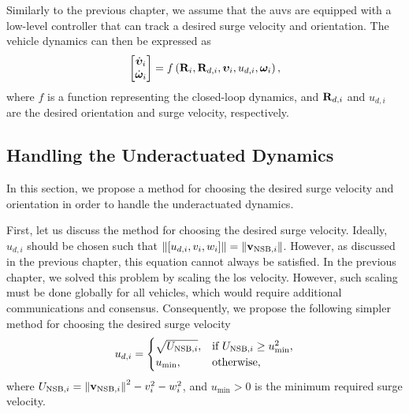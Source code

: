 Similarly to the previous chapter, we assume that the \glspl{auv} are equipped with a low-level controller that can track a desired surge velocity and orientation.
The vehicle dynamics can then be expressed as
\begin{equation}
    \begin{bmatrix}
        \dot{\bm{\upsilon}}_i \\ \dot{\bm{\omega}}_i
    \end{bmatrix}
    = f\left(\mathbf{R}_i, \mathbf{R}_{d,i}, \bm{\upsilon}_i, u_{d, i}, \bm{\omega}_i\right),
\end{equation}
where $f$ is a function representing the closed-loop dynamics, and $\mathbf{R}_{d,i}$ and $u_{d, i}$ are the desired orientation and surge velocity, respectively.

\subsection{Handling the Underactuated Dynamics}
In this section, we propose a method for choosing the desired surge velocity and orientation in order to handle the underactuated dynamics.

First, let us discuss the method for choosing the desired surge velocity.
Ideally, $u_{d, i}$ should be chosen such that $\left\|\left[u_{d, i}, v_i, w_i\right]\right\| = \left\|\mathbf{v}_{{\rm NSB}, i}\right\|$.
However, as discussed in the previous chapter, this equation cannot always be satisfied.
In the previous chapter, we solved this problem by scaling the \gls{los} velocity.
However, such scaling must be done globally for all vehicles, which would require additional communications and consensus.
Consequently, we propose the following simpler method for choosing the desired surge velocity
\begin{equation}
    u_{d, i} = 
    \begin{cases}
        \sqrt{U_{{\rm NSB}, i}}, & \text{if } U_{{\rm NSB}, i} \geq u_{\min}^2, \\
        u_{\min}, & \text{otherwise},
    \end{cases}
    \label{eq:distr_NSB_u_d_i}
\end{equation}
where $U_{{\rm NSB}, i} = \left\|\mathbf{v}_{{\rm NSB}, i}\right\|^2 - v_i^2 - w_i^2$, and $u_{\min} > 0$ is the minimum required surge velocity.

